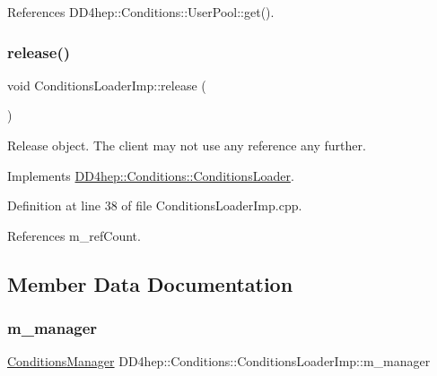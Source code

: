 References D\+D4hep\+::\+Conditions\+::\+User\+Pool\+::get().

\hypertarget{class_d_d4hep_1_1_conditions_1_1_conditions_loader_imp_a757ca1fe35b22abe5d4efde0fdc36396}{}\label{class_d_d4hep_1_1_conditions_1_1_conditions_loader_imp_a757ca1fe35b22abe5d4efde0fdc36396} 
\subsubsection{\texorpdfstring{release()}{release()}}
{\footnotesize\ttfamily void Conditions\+Loader\+Imp\+::release (\begin{DoxyParamCaption}{ }\end{DoxyParamCaption})\hspace{0.3cm}{\ttfamily [virtual]}}



Release object. The client may not use any reference any further. 



Implements \hyperlink{class_d_d4hep_1_1_conditions_1_1_conditions_loader_a0d1ad39d3ed19e648c673497c6995079}{D\+D4hep\+::\+Conditions\+::\+Conditions\+Loader}.



Definition at line 38 of file Conditions\+Loader\+Imp.\+cpp.



References m\+\_\+ref\+Count.



\subsection{Member Data Documentation}
\hypertarget{class_d_d4hep_1_1_conditions_1_1_conditions_loader_imp_ab6ca31cc5ee9e155af821c6c755d60c6}{}\label{class_d_d4hep_1_1_conditions_1_1_conditions_loader_imp_ab6ca31cc5ee9e155af821c6c755d60c6} 
\subsubsection{\texorpdfstring{m\+\_\+manager}{m\_manager}}
{\footnotesize\ttfamily \hyperlink{class_d_d4hep_1_1_conditions_1_1_conditions_manager}{Conditions\+Manager} D\+D4hep\+::\+Conditions\+::\+Conditions\+Loader\+Imp\+::m\+\_\+manager\hspace{0.3cm}{\ttfamily [protected]}}



